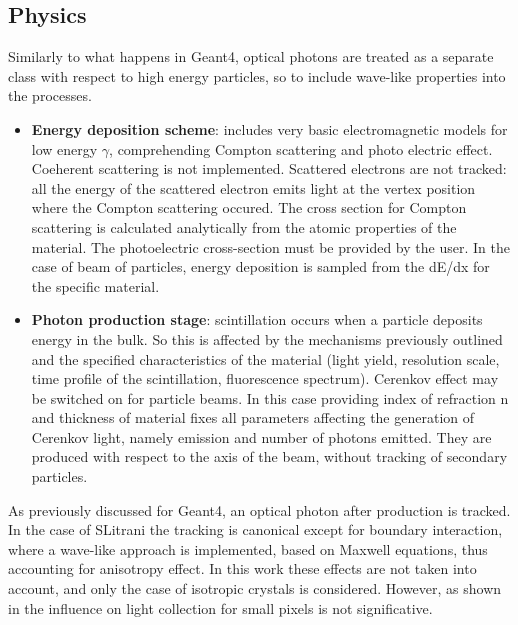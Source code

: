 \subsection{Physics}
Similarly to what happens in Geant4, optical photons are treated as a separate class with respect to high energy particles, so to include wave-like properties into the processes.
\begin{itemize}
\item \textbf{Energy deposition scheme}: includes very basic electromagnetic models for low energy $\gamma$, comprehending Compton scattering and photo electric effect. Coeherent scattering is not implemented. Scattered electrons are not tracked: all the energy of the scattered electron emits light at the vertex position where the Compton scattering occured. 
The cross section for Compton scattering is calculated analytically from the atomic properties of the material.
The photoelectric cross-section must be provided by the user.
In the case of beam of particles, energy deposition is sampled from the dE/dx for the specific material.
\item \textbf{Photon production stage}: scintillation occurs when a particle deposits energy in the bulk. So this is affected by the mechanisms previously outlined and the specified characteristics of the material (light yield, resolution scale, time profile of the scintillation, fluorescence spectrum).
Cerenkov effect may be switched on for particle beams. In this case providing index of refraction n and thickness of material fixes all parameters affecting the generation of Cerenkov light, namely emission and number of photons emitted. They are produced with respect to the axis of the beam, without tracking of secondary particles.
\end{itemize}
As previously discussed for Geant4, an optical photon after production is tracked. In the case of SLitrani the tracking is canonical except for boundary interaction, where a wave-like approach is implemented, based on Maxwell equations, thus accounting for anisotropy effect. In this work these effects are not taken into account, and only the case of isotropic crystals is considered. However, as shown in \cite{Cuccia2013} the influence on light collection for small pixels is not significative.
